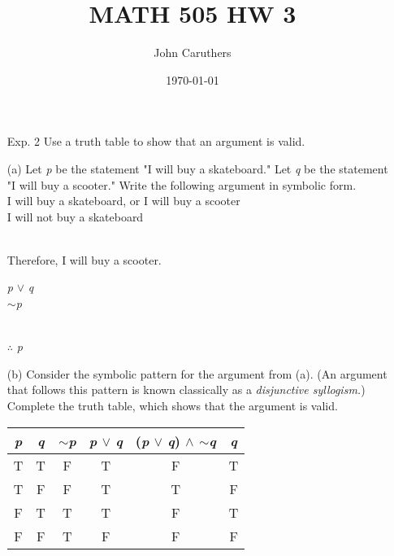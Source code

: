 \documentclass{article}
\title{MATH 505 HW 3}
\author{John Caruthers}
\date\today
\begin{document}
\maketitle

\begin{itemize}
    \item[Exp. 2] Use a truth table to show that an argument is valid.
    
    (a) Let \emph{p} be the statement "I will buy a skateboard." Let \emph{q} be the statement "I will buy a scooter." Write the following argument in symbolic form.\\
    \hspace*{1cm} I will buy a skateboard, or I will buy a scooter\\
    \hspace*{1cm} I will not buy a skateboard\\
    \\
    \hspace*{1cm} Therefore, I will buy a scooter.
    
    \hspace*{1cm} {\color{blue} \emph{p} $\vee$ \emph{q}}\\
    \hspace*{1cm} {\color{blue} $\sim$\emph{p}}\\
    \\
    \hspace*{1cm} {\color{blue} $\therefore$ \emph{p}}
    
    (b) Consider the symbolic pattern for the argument from (a). (An argument that follows this pattern is known classically as a \emph{disjunctive syllogism.}) Complete the truth table, which shows that the argument is valid.
    
    \begin{center}
        \begin{tabular}{|c|c|c|c|c|c|}
            \hline
            \emph{p} & \emph{q} & $\sim$\emph{p} & \emph{p} $\vee$ \emph{q} & (\emph{p} $\vee$ \emph{q}) $\wedge$ $\sim$\emph{q} & \emph{q}\\
            \hline
            T & T & F & T & F & T\\
            \hline
            T & F & F & T & T & F \\
            \hline
            F & T & T & T & F & T \\
            \hline
            F & F & T & F & F & F \\
            \hline
        \end{tabular}
    \end{center}
    

\end{itemize}
\end{document}
